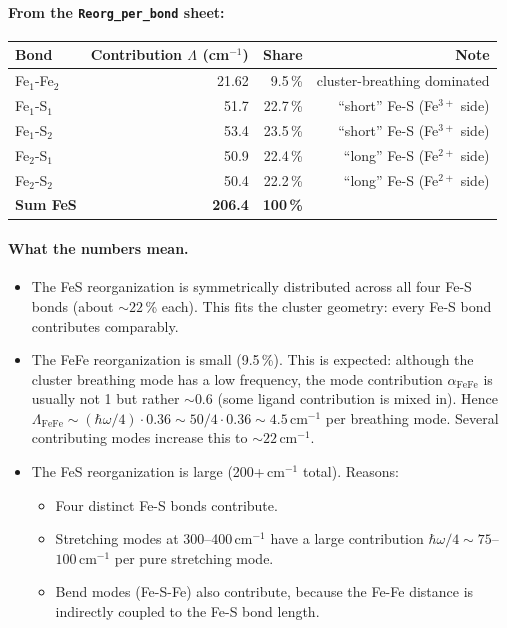 \documentclass[11pt,a4paper,twoside]{article}
\theoremstyle{remark}
\begin{document}
\paragraph{From the \texttt{Reorg\_per\_bond} sheet:}
\begin{center}
\begin{tabular}{lrrr}
  \toprule
  \textbf{Bond} & \textbf{Contribution $\Lambda$ (cm$^{-1}$)} & \textbf{Share} & \textbf{Note} \\
  \midrule
  Fe$_1$-Fe$_2$       &  21.62 & 9.5\,\%  & cluster-breathing dominated \\
  Fe$_1$-S$_1$       &  51.7 & 22.7\,\% & ``short'' Fe-S (Fe$^{3+}$ side) \\
  Fe$_1$-S$_2$       &  53.4 & 23.5\,\% & ``short'' Fe-S (Fe$^{3+}$ side) \\
  Fe$_2$-S$_1$       &  50.9 & 22.4\,\% & ``long'' Fe-S (Fe$^{2+}$ side) \\
  Fe$_2$-S$_2$       &  50.4 & 22.2\,\% & ``long'' Fe-S (Fe$^{2+}$ side) \\
  \midrule
  \textbf{Sum FeS}  & \textbf{206.4} & \textbf{100\,\%} & \\
  \bottomrule
\end{tabular}
\end{center}

\paragraph{What the numbers mean.}
\begin{itemize}\setlength{\itemsep}{0pt}
  \item The FeS reorganization is symmetrically distributed across
        all four Fe-S bonds (about $\sim 22$\,\% each). This fits
        the cluster geometry: every Fe-S bond contributes
        comparably.
  \item The FeFe reorganization is small (9.5\,\%). This is
        expected: although the cluster breathing mode has a low
        frequency, the mode contribution $\alpha_\text{FeFe}$ is
        usually not 1 but rather $\sim 0.6$ (some ligand
        contribution is mixed in). Hence
        $\Lambda_\text{FeFe} \sim
        (\hbar\omega/4)\cdot 0.36 \sim 50/4 \cdot 0.36 \sim
        4.5$\,cm$^{-1}$ per breathing mode. Several contributing
        modes increase this to $\sim 22$\,cm$^{-1}$.
  \item The FeS reorganization is large
        (200+\,cm$^{-1}$ total). Reasons:
        \begin{itemize}
          \item Four distinct Fe-S bonds contribute.
          \item Stretching modes at 300--400\,cm$^{-1}$ have a
                large contribution
                $\hbar\omega/4 \sim 75$--$100$\,cm$^{-1}$ per pure
                stretching mode.
          \item Bend modes (Fe-S-Fe) also contribute, because the
                Fe-Fe distance is indirectly coupled to the Fe-S
                bond length.
        \end{itemize}
\end{itemize}
\end{document}
